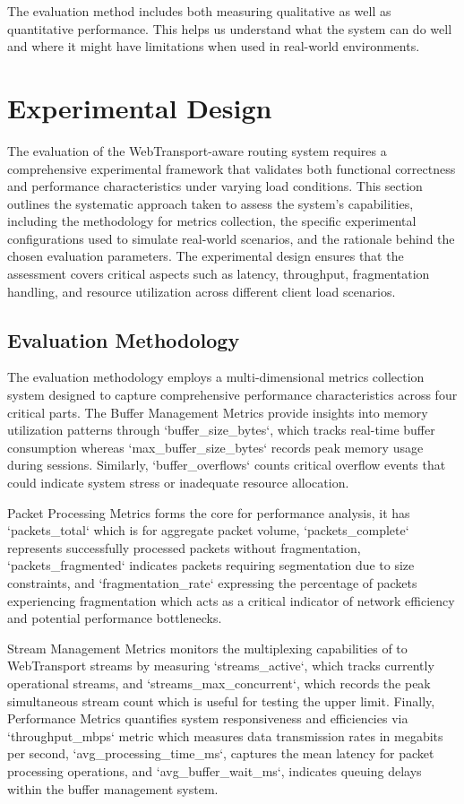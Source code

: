 The evaluation method includes both measuring qualitative as well as quantitative performance. This helps us understand what the system can do well and where it might have limitations when used in real-world environments.


\section{Experimental Design}

The evaluation of the WebTransport-aware routing system requires a comprehensive experimental framework that validates both functional correctness and performance characteristics under varying load conditions. This section outlines the systematic approach taken to assess the system's capabilities, including the methodology for metrics collection, the specific experimental configurations used to simulate real-world scenarios, and the rationale behind the chosen evaluation parameters. The experimental design ensures that the assessment covers critical aspects such as latency, throughput, fragmentation handling, and resource utilization across different client load scenarios.

\subsection{Evaluation Methodology}

The evaluation methodology employs a multi-dimensional metrics collection system designed to capture comprehensive performance characteristics across four critical parts. The Buffer Management Metrics provide insights into memory utilization patterns through `buffer\_size\_bytes`, which tracks real-time buffer consumption whereas `max\_buffer\_size\_bytes` records peak memory usage during sessions. Similarly, `buffer\_overflows` counts critical overflow events that could indicate system stress or inadequate resource allocation. 

Packet Processing Metrics forms the core for performance analysis, it has `packets\_total` which is for aggregate packet volume, `packets\_complete` represents successfully processed packets without fragmentation, `packets\_fragmented` indicates packets requiring segmentation due to size constraints, and `fragmentation\_rate` expressing the percentage of packets experiencing fragmentation which acts as a critical indicator of network efficiency and potential performance bottlenecks.

Stream Management Metrics monitors the multiplexing capabilities of to WebTransport streams by measuring `streams\_active`, which tracks currently operational streams, and `streams\_max\_concurrent`, which records the peak simultaneous stream count which is useful for testing the upper limit. Finally, Performance Metrics quantifies system responsiveness and efficiencies via `throughput\_mbps` metric which measures data transmission rates in megabits per second, `avg\_processing\_time\_ms`, captures the mean latency for packet processing operations, and `avg\_buffer\_wait\_ms`, indicates queuing delays within the buffer management system. 

